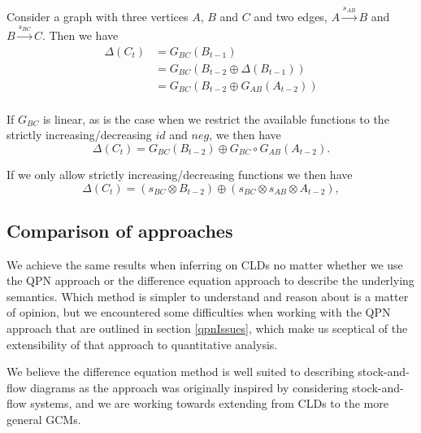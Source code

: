 Consider a graph with three vertices $A$, $B$ and $C$ and two edges,
$A\xrightarrow{s_{AB}} B$ and $B\xrightarrow{s_{BC}} C$.
%
Then we have
\begin{align*}
\Delta(C_t) &= G_{BC}(B_{t-1})\\
&= G_{BC}(B_{t-2} \oplus \Delta(B_{t-1}))\\
&= G_{BC}(B_{t-2} \oplus G_{AB}(A_{t-2}))\\
\end{align*}

If $G_{BC}$ is linear, as is the case when we restrict the available
functions to the strictly increasing/decreasing $id$ and $neg$, we
then have
%
\[\Delta(C_t) = G_{BC}(B_{t-2})\oplus G_{BC}\circ G_{AB}(A_{t-2}).\]

If we only allow strictly increasing/decreasing functions we then have
%
\[\Delta(C_t) = (s_{BC}\otimes B_{t-2})\oplus (s_{BC}\otimes
  s_{AB}\otimes A_{t-2}),\]

\subsection{Comparison of approaches}

We achieve the same results when inferring on CLDs no matter whether
we use the QPN approach or the difference equation approach to
describe the underlying semantics.
%
Which method is simpler to understand and reason about is a matter of
opinion, but we encountered some difficulties when working with the
QPN approach that are outlined in section \ref{qpnIssues}, which make
us sceptical of the extensibility of that approach to quantitative
analysis.

We believe the difference equation method is well suited to describing
stock-and-flow diagrams as the approach was originally inspired by
considering stock-and-flow systems, and we are working towards
extending from CLDs to the more general GCMs.
